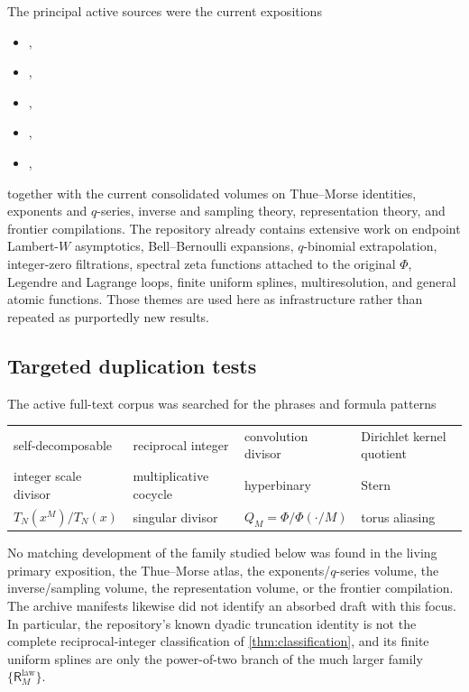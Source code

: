 \documentclass[11pt,oneside]{article}
\theoremstyle{definition}
\theoremstyle{remark}
\newcommand{\ReciprocalIntegerLaw}[1]{\mathsf R^{\mathrm{law}}_{#1}}
\begin{document}
The principal active sources were the current expositions~\cite{ProveItPrimary,ProveItFrontiers}
\begin{itemize}
\item {},
\item {},
\item {},
\item {},
\item {},
\end{itemize}
together with the current consolidated volumes on Thue--Morse identities, exponents and
$q$-series, inverse and sampling theory, representation theory, and frontier compilations.
The repository already contains extensive work on endpoint Lambert-$W$ asymptotics,
Bell--Bernoulli expansions, $q$-binomial extrapolation, integer-zero filtrations, spectral
zeta functions attached to the original $\Phi$, Legendre and Lagrange loops, finite uniform
splines, multiresolution, and general atomic functions.  Those themes are used here as
infrastructure rather than repeated as purportedly new results.

\subsection{Targeted duplication tests}

The active full-text corpus was searched for the phrases and formula patterns
\begin{center}
\begin{tabular}{llll}
\toprule
self-decomposable & reciprocal integer & convolution divisor & Dirichlet kernel quotient\\
integer scale divisor & multiplicative cocycle & hyperbinary & Stern\\
$T_N(x^M)/T_N(x)$ & singular divisor & $Q_M=\Phi/\Phi(\cdot/M)$ & torus aliasing\\
\bottomrule
\end{tabular}
\end{center}
No matching development of the family studied below was found in the living primary
exposition, the Thue--Morse atlas, the exponents/$q$-series volume, the inverse/sampling
volume, the representation volume, or the frontier compilation.  The archive manifests
likewise did not identify an absorbed draft with this focus.  In particular, the repository's
known dyadic truncation identity is not the complete reciprocal-integer classification of
\cref{thm:classification}, and its finite uniform splines are only the power-of-two branch of
the much larger family $\{\ReciprocalIntegerLaw{M}\}$.
\end{document}
